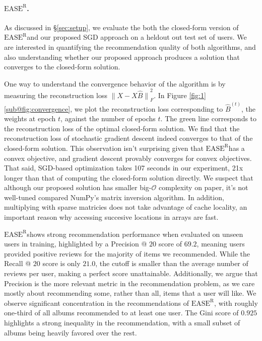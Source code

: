 \documentclass{article}
\newcommand{\easer}{$\text{EASE}^\text{R}$}
\newcommand{\norm}[1]{\ensuremath{\lVert #1 \rVert}}
\newcommand{\secref}[1]{\S\ref{#1}}
\begin{document}
\paragraph*{\easer.}
As discussed in \secref{sec:setup}, we evaluate the both the closed-form
 version of \easer and our proposed SGD approach on a heldout out test set of
 users.
We are interested in quantifying the recommendation quality of both algorithms,
 and also understanding whether our proposed approach produces a solution that
 converges to the closed-form solution.

One way to understand the convergence behavior of the algorithm is by measuring
 the reconstruction loss $\norm{X - X \hat{B}}_F^2$.
In Figure \ref{fig:1}\ref{sub@fig:convergence}, we plot the reconstruction loss
 corresponding to $\hat{B}^{(t)}$, the weights at epoch $t$, against the number
 of epochs $t$.
The green line corresponds to the reconstruction loss of the optimal
 closed-form solution.
We find that the reconstruction loss of stochastic gradient descent indeed
 converges to that of the closed-form solution.
This observation isn't surprising given that \easer has a convex objective, and
 gradient descent provably converges for convex objectives.
That said, SGD-based optimization takes 107 seconds in our experiment, 21x
 longer than that of computing the closed-form solution directly.
We suspect that although our proposed solution has smaller big-$\mathcal{O}$
 complexity on paper, it's not well-tuned compared  NumPy's matrix inversion
 algorithm.
In addition, multiplying with sparse matricies does not take advantage of cache
 locality, an important reason why accessing succesive locations in arrays are
 fast.

\easer shows strong recommendation performance when evaluated on unseen users
in training, highlighted by a Precision @ $20$ score of $69.2$, meaning users
provided
positive reviews for the majority of items we recommended.
While the Recall @ $20$ score is only $21.0$, the cutoff is smaller than the
 average number of reviews per user, making a perfect score unattainable.
Additionally, we argue that Precision is the more relevant metric in the
 recommendation problem, as we care mostly about recommending some, rather than
 all, items that a user will like.
We observe significant concentration in the recommendations of \easer, with
 roughly one-third of all albums recommended to at least one user.
The Gini score of $0.925$ highlights a strong inequality in the recommendation,
 with a small subset of albums being heavily favored over the rest.
\end{document}
